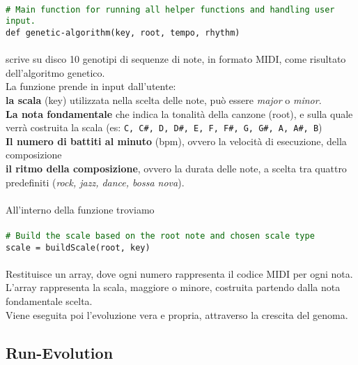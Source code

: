 \documentclass[a4paper,12pt]{report}
\begin{document}
\\
\texttt{\small\textcolor{darkgreen}{\# Main function for running all helper functions and handling user input.}} \\
\texttt{\small def genetic-algorithm(key, root, tempo, rhythm)} \\
\\
scrive su disco 10 genotipi di sequenze di note, in formato MIDI, come risultato dell'algoritmo genetico. \\
La funzione prende in input dall'utente: \\
\textbf{la scala} (key) utilizzata nella scelta delle note, può essere \textit{major} o \textit{minor}. \\
\textbf{La nota fondamentale} che indica la tonalità della canzone (root), e sulla quale verrà costruita la scala (es: \texttt{C, C\#, D, D\#, E, F, F\#, G, G\#, A, A\#, B}) \\
\textbf{Il numero di battiti al minuto} (bpm), ovvero la velocità di esecuzione, della composizione \\
\textbf{il ritmo della composizione}, ovvero la durata delle note, a scelta tra quattro predefiniti (\textit{rock, jazz, dance, bossa nova}). \\
\\
All'interno della funzione troviamo \\
\\
\texttt{\small\textcolor{darkgreen}{\# Build the scale based on the root note and chosen scale type}} \\
\texttt{\small scale = buildScale(root, key)} \\
\\
Restituisce un array, dove ogni numero rappresenta il codice MIDI per ogni nota. \\
L'array rappresenta la scala, maggiore o minore, costruita partendo dalla nota fondamentale scelta. \\
Viene eseguita poi l'evoluzione vera e propria, attraverso la crescita del genoma.

\subsection{Run-Evolution}
\end{document}
